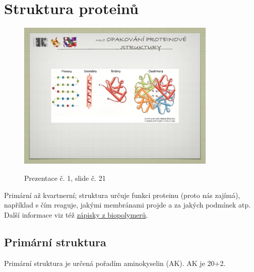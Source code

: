 \documentclass[DIV=8]{scrreprt}
\begin{document}
\chapter{Struktura proteinů} \label{Struktura proteinů}


\begin{figure}
    \caption{Prezentace č. 1, slide č. 21}
    \includegraphics[width=0.85\textwidth]{slides-1/slide-21.jpg}
    \centering
    \label{slides-1-slide-21}
\end{figure}

Primární až kvartnerní; struktura určuje funkci proteinu (proto nás zajímá), například s čím reaguje, jakými membránami projde a za jakých podmínek atp. Další informace viz též \href{/doc/biopolymery/notes.html#Stavba proteinů}{zápisky z biopolymerů}.

\section{Primární struktura} \label{Primární struktura}


Primární struktura je určená pořadím aminokyselin (AK). AK je 20+2.
\end{document}
